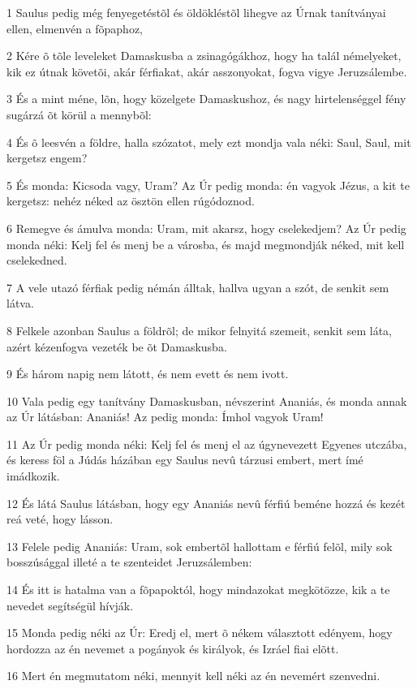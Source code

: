 \par 1 Saulus pedig még fenyegetéstõl és öldökléstõl lihegve az Úrnak tanítványai ellen, elmenvén a fõpaphoz,
\par 2 Kére õ tõle leveleket Damaskusba a zsinagógákhoz, hogy ha talál némelyeket, kik ez útnak követõi, akár férfiakat, akár asszonyokat, fogva vigye Jeruzsálembe.
\par 3 És a mint méne, lõn, hogy közelgete Damaskushoz, és nagy hirtelenséggel fény sugárzá õt körül a mennybõl:
\par 4 És õ leesvén a földre, halla szózatot, mely ezt mondja vala néki: Saul, Saul, mit kergetsz engem?
\par 5 És monda: Kicsoda vagy, Uram? Az Úr pedig monda: én vagyok Jézus, a kit te kergetsz: nehéz néked az ösztön ellen rúgódoznod.
\par 6 Remegve és ámulva monda: Uram, mit akarsz, hogy cselekedjem? Az Úr pedig monda néki: Kelj fel és menj be a városba, és majd megmondják néked, mit kell cselekedned.
\par 7 A vele utazó férfiak pedig némán álltak, hallva ugyan a szót, de senkit sem látva.
\par 8 Felkele azonban Saulus a földrõl; de mikor felnyitá szemeit, senkit sem láta, azért kézenfogva vezeték be õt Damaskusba.
\par 9 És három napig nem látott, és nem evett és nem ivott.
\par 10 Vala pedig egy tanítvány Damaskusban, névszerint Ananiás, és monda annak az Úr látásban: Ananiás! Az pedig monda: Ímhol vagyok Uram!
\par 11 Az Úr pedig monda néki: Kelj fel és menj el az úgynevezett Egyenes utczába, és keress föl a Júdás házában egy Saulus nevû tárzusi embert, mert ímé imádkozik.
\par 12 És látá Saulus látásban, hogy egy Ananiás nevû férfiú beméne hozzá és kezét reá veté, hogy lásson.
\par 13 Felele pedig Ananiás: Uram, sok embertõl hallottam e férfiú felõl, mily sok bosszúsággal illeté a te szenteidet Jeruzsálemben:
\par 14 És itt is hatalma van a fõpapoktól, hogy mindazokat megkötözze, kik a te nevedet segítségül hívják.
\par 15 Monda pedig néki az Úr: Eredj el, mert õ nékem választott edényem, hogy hordozza az én nevemet a pogányok  és királyok, és Izráel  fiai elõtt.
\par 16 Mert én megmutatom néki, mennyit kell néki az én nevemért szenvedni.
